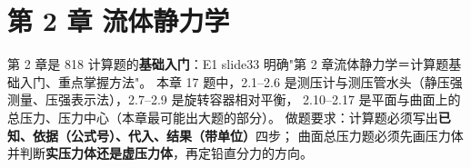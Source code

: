 \chapter*{第 2 章 流体静力学}

\begin{tishi}
第 2 章是 818 计算题的\textbf{基础入门}：E1 slide33 明确"第 2 章流体静力学＝计算题基础入门、重点掌握方法"。
本章 17 题中，2.1--2.6 是测压计与测压管水头（静压强测量、压强表示法），2.7--2.9 是旋转容器相对平衡，
2.10--2.17 是平面与曲面上的总压力、压力中心（本章最可能出大题的部分）。
做题要求：计算题必须写出\textbf{已知、依据（公式号）、代入、结果（带单位）}四步；
曲面总压力题必须先画压力体并判断\textbf{实压力体还是虚压力体}，再定铅直分力的方向。
\end{tishi}


